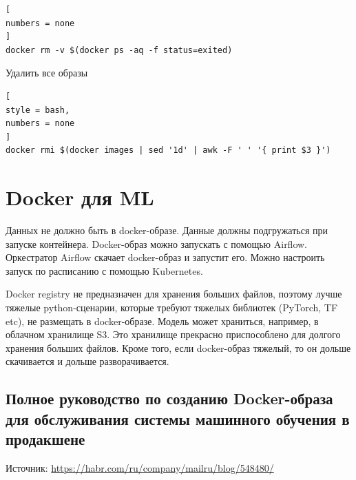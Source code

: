 \documentclass[%
	11pt,
	a4paper,
	utf8,
		]{article}
\begin{document}
\begin{lstlisting}[
numbers = none
]
docker rm -v $(docker ps -aq -f status=exited)
\end{lstlisting}

Удалить все образы 
\begin{lstlisting}[
style = bash,
numbers = none
]
docker rmi $(docker images | sed '1d' | awk -F ' ' '{ print $3 }')
\end{lstlisting}

\section{Docker для ML}

Данных не должно быть в docker-образе. Данные должны подгружаться при запуске контейнера. Docker-образ можно запускать с помощью Airflow. Оркестратор Airflow скачает docker-образ и запустит его. Можно настроить запуск по расписанию с помощью Kubernetes.

Docker registry не предназначен для хранения больших файлов, поэтому лучше тяжелые python-сценарии, которые требуют тяжелых библиотек (PyTorch, TF etc), не размещать в docker-образе. Модель может храниться, например, в облачном хранилище S3. Это хранилище прекрасно приспособлено для долгого хранения больших файлов. Кроме того, если docker-образ тяжелый, то он дольше скачивается и дольше разворачивается.

\subsection{Полное руководство по созданию Docker-образа для обслуживания системы машинного обучения в продакшене}

Источник: \url{https://habr.com/ru/company/mailru/blog/548480/}
\end{document}
